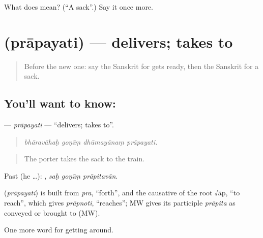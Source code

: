 \begin{tcolorbox}[breakable,colback=teal!4,colframe=teal!35!black,title={Before you move on}]
What does  mean? (\textquotedblleft{}A sack\textquotedblright{}.) Say it once more.
\end{tcolorbox}
\section[\texorpdfstring{\sk{प्रापयति} (prāpayati)}{प्रापयति (prāpayati)}]{ (prāpayati) — delivers; takes to}

\label{lesson:SA-C413-prapayati}



\begin{quote}
Before the new one: say the Sanskrit for gets ready, then the Sanskrit for a sack.
\end{quote}

\subsection*{You'll want to know: }
\textbf{} — \emph{prāpayati} — \textquotedblleft{}delivers; takes to\textquotedblright{}.

\begin{quote}
   
\end{quote}

\begin{quote}
\emph{bhāravāhaḥ goṇīṃ dhūmayānaṃ prāpayati.}
\end{quote}

\begin{quote}
The porter takes the sack to the train.
\end{quote}

Past (he …):   , \emph{saḥ goṇīṃ prāpitavān}.

\begin{cousinweb}
\textbf{} (\emph{prāpayati}) is built from \emph{pra}, \textquotedblleft{}forth\textquotedblright{}, and the causative of the root √āp, \textquotedblleft{}to reach\textquotedblright{}, which gives \emph{prāpnoti}, \textquotedblleft{}reaches\textquotedblright{}; MW gives its participle \emph{prāpita} as conveyed or brought to (MW).
\end{cousinweb}

\begin{grammarlens}[title={What you've built}]
One more word for getting around.
\end{grammarlens}

